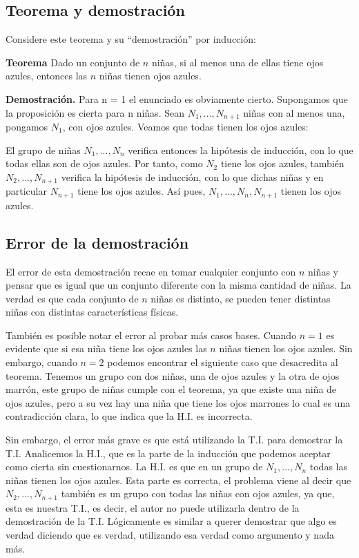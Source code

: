 \documentclass[../doc.tex]{subfiles}
\begin{document}
\subsection{Teorema y demostración}
Considere este teorema y su “demostración” por inducción:

\textbf{Teorema} Dado un conjunto de \(n\) niñas, si al menos una de ellas tiene
ojos azules, entonces las \(n\) niñas tienen ojos azules.

\textbf{Demostración.} Para n = 1 el enunciado es obviamente cierto. Supongamos
que la proposición es cierta para n niñas.
Sean \(N_1, ... , N_{n+1}\) niñas con al menos una, pongamos \(N_1\), con ojos azules.
Veamos que todas tienen los ojos azules:

El grupo de niñas \(N_1, ... , N_n\) verifica entonces la hipótesis de inducción,
con lo que todas ellas son de ojos azules. Por tanto, como \(N_2\) tiene los ojos azules,
también \(N_2, ... , N_{n+1}\) verifica la hipótesis de inducción, con lo que dichas niñas
y en particular \(N_{n+1}\) tiene los ojos azules. Así pues, \(N_1, ... , N_n, N_{n+1}\)
tienen los ojos azules.

\subsection{Error de la demostración}

El error de esta demostración recae en tomar cualquier conjunto con \(n\) niñas y pensar
que es igual que un conjunto diferente con la misma cantidad de niñas. La verdad es que
cada conjunto de \(n\) niñas es distinto, se pueden tener distintas niñas con
distintas características físicas.

También es posible notar el error al probar más casos bases. Cuando \(n = 1\)
es evidente que si esa niña tiene los ojos azules las \(n\) niñas tienen los 
ojos azules. Sin embargo, cuando \(n = 2\) podemos encontrar el siguiente caso 
que desacredita al teorema. Tenemos un grupo con dos niñas, una de ojos azules y 
la otra de ojos marrón, este grupo de niñas cumple con el teorema, ya que existe
una niña de ojos azules, pero a su vez hay una niña que tiene los ojos marrones 
lo cual es una contradicción clara, lo que indica que la H.I. es incorrecta.

Sin embargo, el error más grave es que está utilizando la T.I. para demostrar la T.I.
Analicemos la H.I., que es la parte de la inducción que podemos aceptar como 
cierta sin cuestionarnos. La H.I. es que en un grupo de  $ N_1, ..., N_{n} $ todas 
las niñas tienen los ojos azules. Esta parte es correcta, el problema viene al 
decir que $ N_2, ..., N_{n+1} $ también es un grupo con todas las niñas con ojos
azules, ya que, esta es nuestra T.I., es decir, el autor no puede utilizarla dentro
de la demostración de la T.I. Lógicamente es similar a querer demostrar que 
algo es verdad diciendo que es verdad, utilizando esa verdad como argumento y nada más.
\end{document}
